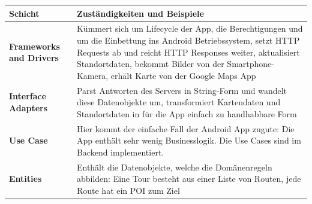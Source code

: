 \documentclass[a4paper,10pt,xetex]{article}
\begin{document}
\begin{longtabu} to \textwidth { | l | X[l] |  }
\hline
\textbf{Schicht} &  \textbf{Zuständigkeiten und Beispiele} \\\hline
\endhead
\textbf{Frameworks and Drivers} & Kümmert sich um Lifecycle der App, die Berechtigungen
und um die Einbettung ins Android Betriebssystem, setzt HTTP Requests ab und reicht
HTTP Responses weiter, aktualisiert Standortdaten, bekommt Bilder von der
Smartphone-Kamera, erhält Karte von der Google Maps App\\\hline
\textbf{Interface Adapters} & Parst Antworten des Servers in String-Form und wandelt
diese Datenobjekte um, transformiert Kartendaten und Standortdaten in für die App
einfach zu handhabbare Form\\\hline
\textbf{Use Case} & Hier kommt der einfache Fall der Android App zugute: Die App
enthält sehr wenig Businesslogik. Die Use Cases sind im Backend implementiert.\\\hline
\textbf{Entities} & Enthält die Datenobjekte, welche die Domänenregeln abbilden:
Eine Tour besteht aus einer Liste von Routen, jede Route hat ein POI zum Ziel\\\hline
\end{longtabu}

\newpage
\end{document}
